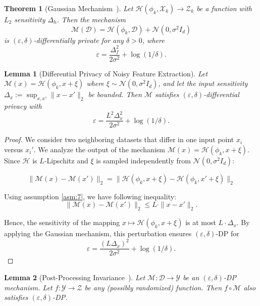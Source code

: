 \documentclass[lettersize,journal]{IEEEtran}
\newtheorem{theorem}{Theorem}
\newtheorem{lemma}{Lemma}
\newtheorem{proof}{Proof}
\begin{document}
\begin{theorem}[Gaussian Mechanism~\cite{dwork2014algorithmic}]
Let $\mathcal{H}(\phi_k,\mathcal{X}_k) \rightarrow \mathcal{Z}_k$ be a function with $L_2$ sensitivity $\Delta_h$. Then the mechanism
\[
\mathcal{M}(\mathcal{D}) = \mathcal{H}(\phi_k,\mathcal{D}) + \mathcal{N}(0, \sigma^2 I_d)
\]
is $(\varepsilon, \delta)$-differentially private for any $\delta > 0$, where
\[
\varepsilon = \frac{\Delta_f^2}{2 \sigma^2} + \log(1/\delta).
\]
\end{theorem}

\begin{lemma}[Differential Privacy of Noisy Feature Extraction]
\label{lemma:3}
Let $\mathcal{M}(x) = \mathcal{H}(\phi_k, x + \xi)$ where $\xi \sim \mathcal{N}(0, \sigma^2 I_d)$, and let the input sensitivity $\Delta_x := \sup_{x,x'} \|x - x'\|_2$ be bounded. Then $\mathcal{M}$ satisfies $(\varepsilon, \delta)$-differential privacy with
\[
\varepsilon = \frac{L^2 \Delta_x^2}{2 \sigma^2} + \log(1/\delta).
\]
\end{lemma}

\begin{proof}
We consider two neighboring datasets that differ in one input point $x_i$ versus $x_i'$. We analyze the output of the mechanism $\mathcal{M}(x) = \mathcal{H}(\phi_k, x + \xi)$. Since $\mathcal{H}$ is $L$-Lipschitz and $\xi$ is sampled independently from $\mathcal{N}(0, \sigma^2 I_d)$:

\begin{equation}
\|\mathcal{M}(x) - \mathcal{M}(x')\|_2 
= \|\mathcal{H}(\phi_k, x + \xi) - \mathcal{H}(\phi_k, x' + \xi)\|_2
\end{equation}

Using assumption \ref{asm:7}, we have following inequality:
\begin{equation}
\|\mathcal{M}(x) - \mathcal{M}(x')\|_2  \leq L \cdot \|x - x'\|_2.
\end{equation}

Hence, the sensitivity of the mapping $x \mapsto \mathcal{H}(\phi_k, x + \xi)$ is at most $L \cdot \Delta_x$. By applying the Gaussian mechanism, this perturbation ensures $(\varepsilon, \delta)$-DP for
\[
\varepsilon = \frac{(L \Delta_x)^2}{2 \sigma^2} + \log(1/\delta).
\]
\end{proof}

\begin{lemma}[Post-Processing Invariance~\cite{dwork2014algorithmic}]
\label{lemma:4}
Let $\mathcal{M} : \mathcal{D} \rightarrow \mathcal{Y}$ be an $(\varepsilon, \delta)$-DP mechanism. Let $f : \mathcal{Y} \rightarrow \mathcal{Z}$ be any (possibly randomized) function. Then $f \circ \mathcal{M}$ also satisfies $(\varepsilon, \delta)$-DP.
\end{lemma}
\end{document}
